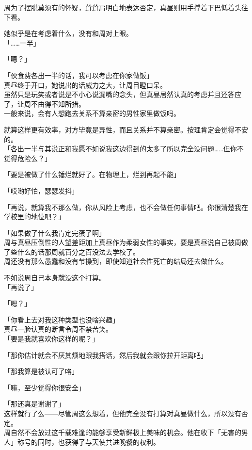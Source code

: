 周为了摆脱莫须有的怀疑，耸耸肩明白地表达否定，真昼则用手撑着下巴低着头往下看。

她似乎是在考虑着什么，没有和周对上眼。\\

「……一半」

「嗯？」

「伙食费各出一半的话，我可以考虑在你家做饭」\\

真昼终于开口，她说出的话威力之大，让周目瞪口呆。\\

虽然只是玩笑或者说是不小心说漏嘴的念头，但真昼居然认真的考虑并且还答应了，让周不由得不知所措。\\

一般来说，会有人想跑去关系不算亲密的男性家里做饭吗。

就算这样更有效率，对方毕竟是异性，而且关系并不算亲密。按理肯定会觉得不安的。\\

「各出一半与其说正和我愿不如说我这边得到的太多了所以完全没问题……但你不觉得危险么？」

「要是被做了什么锤烂就好了。在物理上，烂到再起不能」

「哎哟好怕，瑟瑟发抖」

「再说，就算我不那么做，你从风险上考虑，也不会做任何事情吧。你很清楚我在学校里的地位吧？」

「如果做了什么我肯定完蛋了啊」\\

周与真昼压倒性的人望差距加上真昼作为柔弱女性的事实，要是真昼说自己被周做了些什么的话那周就百分之百没法去学校了。\\

周还没有那么愚蠢和没有节操到，即使知道社会性死亡的结局还去做什么。

不如说周自己本身就没这个打算。\\

「再说了」

「嗯？」

「你看上去对我这种类型也没啥兴趣」\\

真昼一脸认真的断言令周不禁苦笑。\\

「要是我就喜欢你这样的呢？」

「那你估计就会不厌其烦地跟我搭话，然后我就会跟你拉开距离吧」

「那我算是被认可了咯」

「嘛，至少觉得你很安全」

「那还真是谢谢了」\\

这样就行了么——尽管周这么想着，但他完全没有打算对真昼做什么，所以没有否定。\\

周自然不会放过这千载难逢的能够享受新鲜极上美味的机会。他在收下「无害的男人」称号的同时，也获得了与天使共进晚餐的权利。
